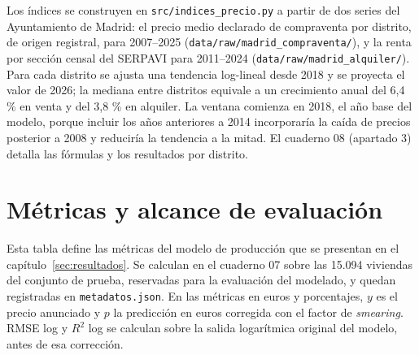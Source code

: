 \documentclass[11pt,a4paper]{article}
\newcounter{anexo}
\begin{document}
Los índices se construyen en \texttt{src/indices\_precio.py} a partir de dos series del Ayuntamiento de Madrid: el precio medio declarado de compraventa por distrito, de origen registral, para 2007--2025 (\texttt{data/raw/madrid\_compraventa/}), y la renta por sección censal del SERPAVI para 2011--2024 (\texttt{data/raw/madrid\_alquiler/}). Para cada distrito se ajusta una tendencia log-lineal desde 2018 y se proyecta el valor de 2026; la mediana entre distritos equivale a un crecimiento anual del 6,4 \% en venta y del 3,8 \% en alquiler. La ventana comienza en 2018, el año base del modelo, porque incluir los años anteriores a 2014 incorporaría la caída de precios posterior a 2008 y reduciría la tendencia a la mitad. El cuaderno 08 (apartado 3) detalla las fórmulas y los resultados por distrito.
\clearpage{}\label{anx:\theanexo}%
\section*{\theanexo\hspace{0.6em}Métricas y alcance de evaluación}

Esta tabla define las métricas del modelo de producción que se presentan en el capítulo~\ref{sec:resultados}. Se calculan en el cuaderno 07 sobre las 15.094 viviendas del conjunto de prueba, reservadas para la evaluación del modelado, y quedan registradas en \texttt{metadatos.json}. En las métricas en euros y porcentajes, $y$ es el precio anunciado y $p$ la predicción en euros corregida con el factor de \emph{smearing}. RMSE log y $R^2$ log se calculan sobre la salida logarítmica original del modelo, antes de esa corrección.
\end{document}
